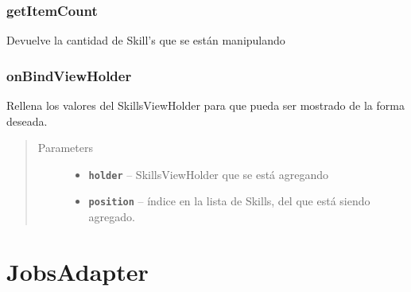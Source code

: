 \documentclass[letterpaper,10pt,english]{sphinxmanual}
\begin{document}
\subsubsection{getItemCount}
\label{Adapter/SkillsAdapter:getitemcount}

\begin{fulllineitems}
\label{Adapter/SkillsAdapter:com.fiuba.tallerii.jobify.SkillsAdapter.getItemCount()}
Devuelve la cantidad de Skill's que se están manipulando

\end{fulllineitems}



\subsubsection{onBindViewHolder}
\label{Adapter/SkillsAdapter:onbindviewholder}

\begin{fulllineitems}
\label{Adapter/SkillsAdapter:com.fiuba.tallerii.jobify.SkillsAdapter.onBindViewHolder(SkillsViewHolder, int)}
Rellena los valores del SkillsViewHolder para que pueda ser mostrado de la forma deseada.
\begin{quote}\begin{description}
\item[{Parameters}] \leavevmode\begin{itemize}
\item {} 
\textbf{\texttt{holder}} -- SkillsViewHolder que se está agregando

\item {} 
\textbf{\texttt{position}} -- índice en la lista de Skills, del  que está siendo agregado.

\end{itemize}

\end{description}\end{quote}

\end{fulllineitems}



\section{JobsAdapter}
\label{Adapter/JobsAdapter::doc}\label{Adapter/JobsAdapter:jobsadapter}
\end{document}
